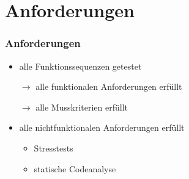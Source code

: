 \section{Anforderungen}

\begin{frame}\frametitle{Anforderungen}
    \begin{itemize}
        \item alle Funktionssequenzen getestet
        \item[$\rightarrow$] alle funktionalen Anforderungen erfüllt
        \item[$\rightarrow$] alle Musskriterien erfüllt
        \item alle nichtfunktionalen Anforderungen erfüllt
        \begin{itemize}
            \item Stresstests
            \item statische Codeanalyse
        \end{itemize}
    \end{itemize}
\end{frame}